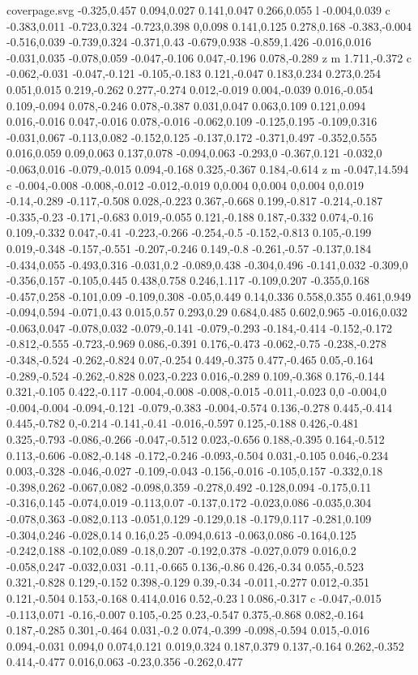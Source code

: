 \begin{filecontents}[noheader]{coverpage.svg}
-0.325,0.457 0.094,0.027 0.141,0.047 0.266,0.055 l -0.004,0.039 c -0.383,0.011 -0.723,0.324 -0.723,0.398 0,0.098 0.141,0.125 0.278,0.168 -0.383,-0.004 -0.516,0.039 -0.739,0.324 -0.371,0.43 -0.679,0.938 -0.859,1.426 -0.016,0.016 -0.031,0.035 -0.078,0.059 -0.047,-0.106 0.047,-0.196 0.078,-0.289 z m 1.711,-0.372 c -0.062,-0.031 -0.047,-0.121 -0.105,-0.183 0.121,-0.047 0.183,0.234 0.273,0.254 0.051,0.015 0.219,-0.262 0.277,-0.274 0.012,-0.019 0.004,-0.039 0.016,-0.054 0.109,-0.094 0.078,-0.246 0.078,-0.387 0.031,0.047 0.063,0.109 0.121,0.094 0.016,-0.016 0.047,-0.016 0.078,-0.016 -0.062,0.109 -0.125,0.195 -0.109,0.316 -0.031,0.067 -0.113,0.082 -0.152,0.125 -0.137,0.172 -0.371,0.497 -0.352,0.555 0.016,0.059 0.09,0.063 0.137,0.078 -0.094,0.063 -0.293,0 -0.367,0.121 -0.032,0 -0.063,0.016 -0.079,-0.015 0.094,-0.168 0.325,-0.367 0.184,-0.614 z m -0.047,14.594 c -0.004,-0.008 -0.008,-0.012 -0.012,-0.019 0,0.004 0,0.004 0,0.004 0,0.019 -0.14,-0.289 -0.117,-0.508 0.028,-0.223 0.367,-0.668 0.199,-0.817 -0.214,-0.187 -0.335,-0.23 -0.171,-0.683 0.019,-0.055 0.121,-0.188 0.187,-0.332 0.074,-0.16 0.109,-0.332 0.047,-0.41 -0.223,-0.266 -0.254,-0.5 -0.152,-0.813 0.105,-0.199 0.019,-0.348 -0.157,-0.551 -0.207,-0.246 0.149,-0.8 -0.261,-0.57 -0.137,0.184 -0.434,0.055 -0.493,0.316 -0.031,0.2 -0.089,0.438 -0.304,0.496 -0.141,0.032 -0.309,0 -0.356,0.157 -0.105,0.445 0.438,0.758 0.246,1.117 -0.109,0.207 -0.355,0.168 -0.457,0.258 -0.101,0.09 -0.109,0.308 -0.05,0.449 0.14,0.336 0.558,0.355 0.461,0.949 -0.094,0.594 -0.071,0.43 0.015,0.57 0.293,0.29 0.684,0.485 0.602,0.965 -0.016,0.032 -0.063,0.047 -0.078,0.032 -0.079,-0.141 -0.079,-0.293 -0.184,-0.414 -0.152,-0.172 -0.812,-0.555 -0.723,-0.969 0.086,-0.391 0.176,-0.473 -0.062,-0.75 -0.238,-0.278 -0.348,-0.524 -0.262,-0.824 0.07,-0.254 0.449,-0.375 0.477,-0.465 0.05,-0.164 -0.289,-0.524 -0.262,-0.828 0.023,-0.223 0.016,-0.289 0.109,-0.368 0.176,-0.144 0.321,-0.105 0.422,-0.117 -0.004,-0.008 -0.008,-0.015 -0.011,-0.023 0,0 -0.004,0 -0.004,-0.004 -0.094,-0.121 -0.079,-0.383 -0.004,-0.574 0.136,-0.278 0.445,-0.414 0.445,-0.782 0,-0.214 -0.141,-0.41 -0.016,-0.597 0.125,-0.188 0.426,-0.481 0.325,-0.793 -0.086,-0.266 -0.047,-0.512 0.023,-0.656 0.188,-0.395 0.164,-0.512 0.113,-0.606 -0.082,-0.148 -0.172,-0.246 -0.093,-0.504 0.031,-0.105 0.046,-0.234 0.003,-0.328 -0.046,-0.027 -0.109,-0.043 -0.156,-0.016 -0.105,0.157 -0.332,0.18 -0.398,0.262 -0.067,0.082 -0.098,0.359 -0.278,0.492 -0.128,0.094 -0.175,0.11 -0.316,0.145 -0.074,0.019 -0.113,0.07 -0.137,0.172 -0.023,0.086 -0.035,0.304 -0.078,0.363 -0.082,0.113 -0.051,0.129 -0.129,0.18 -0.179,0.117 -0.281,0.109 -0.304,0.246 -0.028,0.14 0.16,0.25 -0.094,0.613 -0.063,0.086 -0.164,0.125 -0.242,0.188 -0.102,0.089 -0.18,0.207 -0.192,0.378 -0.027,0.079 0.016,0.2 -0.058,0.247 -0.032,0.031 -0.11,-0.665 0.136,-0.86 0.426,-0.34 0.055,-0.523 0.321,-0.828 0.129,-0.152 0.398,-0.129 0.39,-0.34 -0.011,-0.277 0.012,-0.351 0.121,-0.504 0.153,-0.168 0.414,0.016 0.52,-0.23 l 0.086,-0.317 c -0.047,-0.015 -0.113,0.071 -0.16,-0.007 0.105,-0.25 0.23,-0.547 0.375,-0.868 0.082,-0.164 0.187,-0.285 0.301,-0.464 0.031,-0.2 0.074,-0.399 -0.098,-0.594 0.015,-0.016 0.094,-0.031 0.094,0 0.074,0.121 0.019,0.324 0.187,0.379 0.137,-0.164 0.262,-0.352 0.414,-0.477 0.016,0.063 -0.23,0.356 -0.262,0.477 
\end{filecontents}
